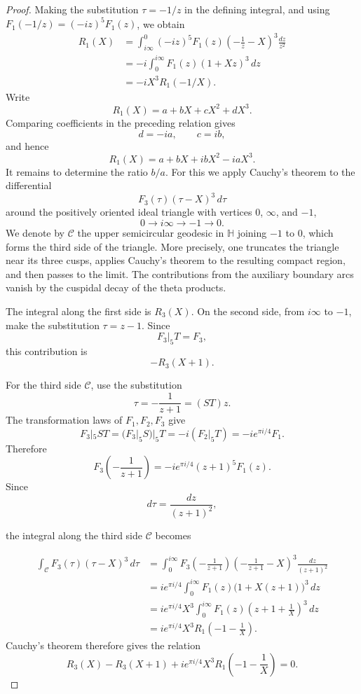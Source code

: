 \documentclass[preprint,12pt]{elsarticle}
\theoremstyle{definition}
\theoremstyle{remark}
\newcommand{\HH}{\mathbb{H}}
\begin{document}
	\begin{proof}
	Making the substitution $\tau=-1/z$ in the defining integral, and using
	$F_1(-1/z)=(-iz)^5F_1(z)$, we obtain
	\begin{align*}
		R_1(X)
		&=\int_{i\infty}^{0}(-iz)^5F_1(z)
		\left(-\frac{1}{z}-X\right)^3\frac{dz}{z^2}\\
		&=-i\int_0^{i\infty}F_1(z)(1+Xz)^3\,dz\\
		&=-iX^3R_1(-1/X).
	\end{align*}
Write
		\[
		R_1(X)=a+bX+cX^2+dX^3.
		\]
		Comparing coefficients in the preceding relation gives
		\[
		d=-ia,\qquad c=ib,
		\]
		and hence
		\[
		R_1(X)=a+bX+ibX^2-iaX^3.
		\]
It remains to determine the ratio $b/a$.  For this we apply Cauchy's theorem to the differential
\[
F_3(\tau)(\tau-X)^3\,d\tau
\]
around the positively oriented ideal triangle with vertices $0$, $\infty$, and $-1$,
\[
0\longrightarrow i\infty\longrightarrow -1\longrightarrow 0.
\]
We denote by $\mathcal{C}$ the upper semicircular geodesic in $\HH$ joining $-1$ to $0$, which forms the third side of the triangle.  More precisely, one truncates the triangle near its three cusps, applies Cauchy's theorem to the resulting compact region, and then passes to the limit.  The contributions from the auxiliary boundary arcs vanish by the cuspidal decay of the theta products.
		
		The integral along the first side is $R_3(X)$.  On the second side, from $i\infty$ to $-1$, make the substitution $\tau=z-1$.  Since
		\[
		F_3|_5T=F_3,
		\]
		this contribution is
		\[
		-R_3(X+1).
		\]
		
		For the third side $\mathcal{C}$, use the substitution
		\[
		\tau=-\frac{1}{z+1}=(ST)z.
		\]
		The transformation laws of $F_1,F_2,F_3$ give
		\[
		F_3|_5ST=(F_3|_5S)|_5T=-i(F_2|_5T)=-ie^{\pi i/4}F_1.
		\]
		Therefore
		\[
		F_3\left(-\frac{1}{z+1}\right)=-ie^{\pi i/4}(z+1)^5F_1(z).
		\]
		Since
		\[
		d\tau=\frac{dz}{(z+1)^2},
		\]
		
		
		
		the integral along the third side $\mathcal{C}$ becomes
		
		
		\begin{align*}
			\int_\mathcal{C}F_3(\tau)(\tau-X)^3\,d\tau
			&=\int_0^{i\infty}
			F_3\left(-\frac{1}{z+1}\right)
			\left(-\frac{1}{z+1}-X\right)^3
			\frac{dz}{(z+1)^2}\\
		&=ie^{\pi i/4}\int_0^{i\infty}F_1(z)\bigl(1+X(z+1)\bigr)^3\,dz\\
			&=ie^{\pi i/4}X^3\int_0^{i\infty}F_1(z)
			\left(z+1+\frac{1}{X}\right)^3\,dz\\
			&=ie^{\pi i/4}X^3R_1\left(-1-\frac{1}{X}\right).
		\end{align*}
		Cauchy's theorem therefore gives the relation
		\[
		R_3(X)-R_3(X+1)+ie^{\pi i/4}X^3R_1\left(-1-\frac{1}{X}\right)=0.
		\]
		

\end{proof}
\end{document}

